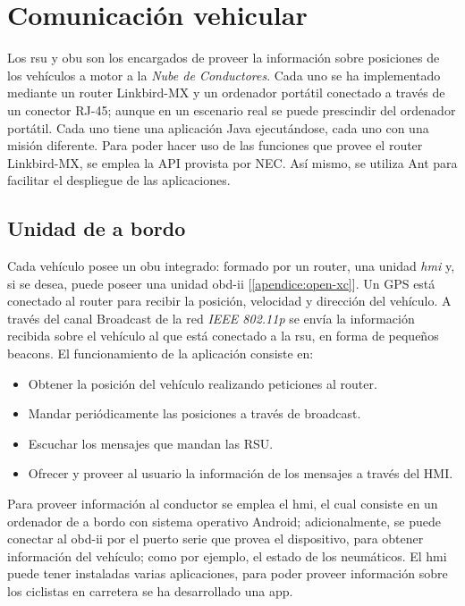 \section{Comunicación vehicular}\label{section:comunicacion_vehicular}
Los \gls{rsu} y \gls{obu} son los encargados de proveer la información sobre posiciones de los vehículos a motor a la \emph{Nube de Conductores}. Cada uno se ha implementado mediante un router Linkbird-MX y un ordenador portátil conectado a través de un conector RJ-45; aunque en un escenario real se puede prescindir del ordenador portátil. Cada uno tiene una aplicación Java ejecutándose, cada uno con una misión diferente. Para poder hacer uso de las funciones que provee el router Linkbird-MX, se emplea la API provista por NEC. Así mismo, se utiliza Ant para facilitar el despliegue de las aplicaciones.

\subsection{Unidad de a bordo}
Cada vehículo posee un \gls{obu} integrado: formado por un router, una unidad \emph{hmi} y, si se desea, puede poseer una unidad \Gls{obd-ii} [\ref{apendice:open-xc}]. Un GPS está conectado al router para recibir la posición, velocidad y dirección del vehículo. A través del canal Broadcast de la red \emph{IEEE 802.11p} se envía la información recibida sobre el vehículo al que está conectado a la \gls{rsu}, en forma de pequeños beacons. El funcionamiento de la aplicación consiste en:
\begin{itemize}
	\item Obtener la posición del vehículo realizando peticiones al router.
	\item Mandar periódicamente las posiciones a través de broadcast.
	\item Escuchar los mensajes que mandan las RSU.
	\item Ofrecer y proveer al usuario la información de los mensajes a través del HMI.
\end{itemize}

Para proveer información al conductor se emplea el \gls{hmi}, el cual consiste en un ordenador de a bordo con sistema operativo Android; adicionalmente, se puede conectar al \Gls{obd-ii} por el puerto serie que provea el dispositivo, para obtener información del vehículo; como por ejemplo, el estado de los neumáticos. El \gls{hmi} puede tener instaladas varias aplicaciones, para poder proveer información sobre los ciclistas en carretera se ha desarrollado una app.

